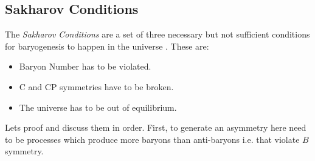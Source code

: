 \documentclass[13pt,a4paper,titlepage]{article}
\begin{document}
\subsection{Sakharov Conditions}
\label{sec:sakharov_conditions}

The \emph{Sakharov Conditions} are a set of three necessary but not sufficient conditions for baryogenesis to happen in the universe \cite{Sakharov_1991}. These are:
\begin{itemize}
    \item Baryon Number has to be violated.
    \item C and CP symmetries have to be broken.
    \item The universe has to be out of equilibrium.
\end{itemize}
Lets proof and discuss them in order.
First, to generate an asymmetry here need to be processes which produce more baryons than anti-baryons i.e. that violate $B$ symmetry.
\end{document}
